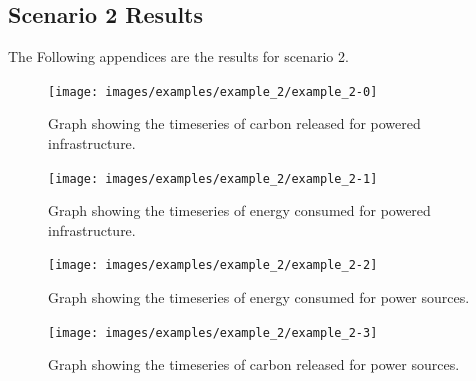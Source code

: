 \documentclass{l4proj}
\begin{document}
\begin{appendices}
\section{Scenario 2 Results}\label{apen:subsec:scen2}
The Following appendices are the results for scenario 2.
\begin{figure}[htbp]
    \centering
    \texttt{[image: images/examples/example\_2/example\_2-0]}
    ~
    \caption{Graph showing the timeseries of carbon released for powered infrastructure.}
    \label{fig:example2-0}
\end{figure}
\clearpage
\begin{figure}[htbp]
    \centering
    \texttt{[image: images/examples/example\_2/example\_2-1]}
    ~
    \caption{Graph showing the timeseries of energy consumed for powered infrastructure.}
    \label{fig:example2-1}
\end{figure}
\clearpage
\begin{figure}[htbp]
    \centering
    \texttt{[image: images/examples/example\_2/example\_2-2]}
    ~
    \caption{Graph showing the timeseries of energy consumed for power sources.}
    \label{fig:example2-2}
\end{figure}
\clearpage
\begin{figure}[htbp]
    \centering
    \texttt{[image: images/examples/example\_2/example\_2-3]}
    ~
    \caption{Graph showing the timeseries of carbon released for power sources.}
    \label{fig:example2-3}
\end{figure}
\clearpage

\end{appendices}
\end{document}
